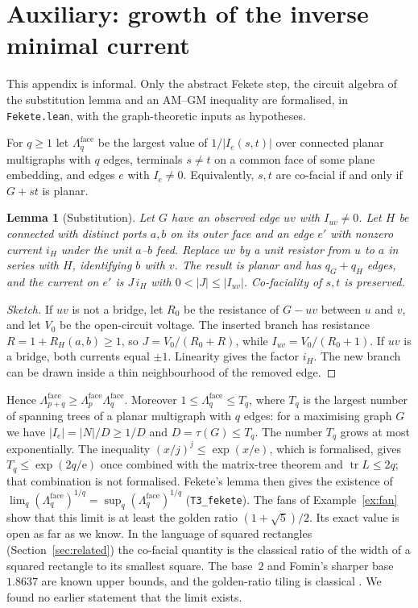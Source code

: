 \documentclass[11pt]{amsart}
\theoremstyle{plain}
\newtheorem{lemma}[theorem]{Lemma}
\theoremstyle{definition}
\theoremstyle{remark}
\newcommand{\code}[1]{\texttt{#1}}
\begin{document}
\appendix
\section{Auxiliary: growth of the inverse minimal current}\label{app:growth}

This appendix is informal. Only the abstract Fekete step, the circuit algebra of the substitution lemma and an
AM--GM inequality are formalised, in \code{Fekete.lean}, with the graph-theoretic inputs as hypotheses.

For $q\ge1$ let $\Lambda^{\mathrm{face}}_q$ be the largest value of $1/|I_e(s,t)|$ over connected planar
multigraphs with $q$ edges, terminals $s\neq t$ on a common face of some plane embedding, and edges $e$ with
$I_e\neq0$. Equivalently, $s,t$ are co-facial if and only if $G+st$ is planar.

\begin{lemma}[Substitution]
Let $G$ have an observed edge $uv$ with $I_{uv}\neq0$. Let $H$ be connected with distinct ports $a,b$ on its outer
face and an edge $e'$ with nonzero current $i_H$ under the unit $a$--$b$ feed. Replace $uv$ by a unit resistor from
$u$ to $a$ in series with $H$, identifying $b$ with $v$. The result is planar and has $q_G+q_H$ edges, and the current
on $e'$ is $J\,i_H$ with $0<|J|\le|I_{uv}|$. Co-faciality of $s,t$ is preserved.
\end{lemma}
\begin{proof}[Sketch]
If $uv$ is not a bridge, let $R_0$ be the resistance of $G-uv$ between $u$ and $v$, and let $V_0$ be the open-circuit
voltage. The inserted branch has resistance $R=1+R_H(a,b)\ge1$, so $J=V_0/(R_0+R)$, while $I_{uv}=V_0/(R_0+1)$.
If $uv$ is a bridge, both currents equal $\pm1$. Linearity gives the factor $i_H$. The new branch can be drawn
inside a thin neighbourhood of the removed edge.
\end{proof}

Hence $\Lambda^{\mathrm{face}}_{p+q}\ge\Lambda^{\mathrm{face}}_p\Lambda^{\mathrm{face}}_q$. Moreover
$1\le\Lambda^{\mathrm{face}}_q\le T_q$, where $T_q$ is the largest number of spanning trees of a planar
multigraph with $q$ edges: for a maximising graph $G$ we have $|I_e|=|N|/D\ge1/D$ and $D=\tau(G)\le T_q$. The
number $T_q$ grows at most exponentially. The inequality $(x/j)^j\le\exp(x/\mathrm e)$, which is formalised, gives
$T_q\le\exp(2q/\mathrm e)$ once combined with the matrix-tree theorem and $\operatorname{tr}L\le2q$; that
combination is not formalised. Fekete's lemma \cite{Fekete} then gives the existence of
$\lim_q(\Lambda^{\mathrm{face}}_q)^{1/q}=\sup_q(\Lambda^{\mathrm{face}}_q)^{1/q}$ (\code{T3\_fekete}). The fans of
Example~\ref{ex:fan} show that this limit is at least the golden ratio $(1+\sqrt5)/2$. Its exact value is open as
far as we know. In the language of squared rectangles (Section~\ref{sec:related}) the co-facial quantity is the
classical ratio of the width of a squared rectangle to its smallest square. The base~$2$ and Fomin's sharper base
$1.8637$ \cite{Fomin} are known upper bounds, and the golden-ratio tiling is classical \cite{Kenyon,Keleti}. We
found no earlier statement that the limit exists.
\end{document}
